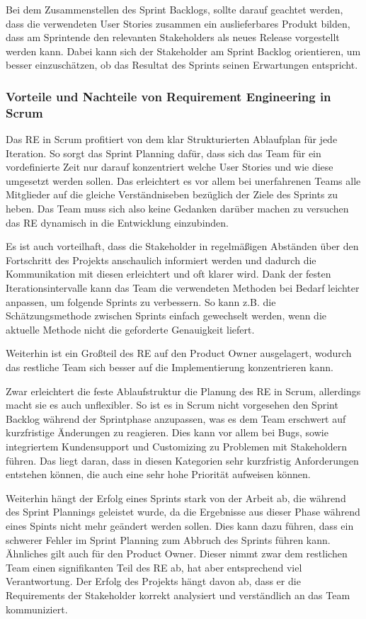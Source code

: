 \documentclass[acmtog]{acmart}
\begin{document}
Bei dem Zusammenstellen des Sprint Backlogs, sollte darauf geachtet werden, dass die verwendeten User Stories zusammen ein auslieferbares 
Produkt bilden, dass am Sprintende den relevanten Stakeholders als neues Release vorgestellt werden kann. Dabei kann sich der Stakeholder 
am Sprint Backlog orientieren, um besser einzuschätzen, ob das Resultat des Sprints seinen Erwartungen entspricht. \cite{reinscrum}

\subsubsection{Vorteile und Nachteile von Requirement Engineering in Scrum}

Das RE in Scrum profitiert von dem klar Strukturierten Ablaufplan für jede Iteration. So sorgt das Sprint Planning dafür, dass sich das 
Team für ein vordefinierte Zeit nur darauf konzentriert welche User Stories  und wie diese umgesetzt werden sollen. Das erleichtert es vor 
allem bei unerfahrenen Teams alle Mitglieder auf die gleiche Verständniseben bezüglich der Ziele des Sprints zu heben. Das Team muss sich 
also keine Gedanken darüber machen zu versuchen das RE dynamisch in die Entwicklung einzubinden.

Es ist auch vorteilhaft, dass die Stakeholder in regelmäßigen Abständen über den Fortschritt des Projekts anschaulich informiert werden und 
dadurch die Kommunikation mit diesen erleichtert und oft klarer wird. Dank der festen Iterationsintervalle kann das Team die verwendeten 
Methoden bei Bedarf leichter anpassen, um folgende Sprints zu verbessern. So kann z.B. die Schätzungsmethode zwischen Sprints einfach gewechselt 
werden, wenn die aktuelle Methode nicht die geforderte Genauigkeit liefert.

Weiterhin ist ein Großteil des RE auf den Product Owner ausgelagert, wodurch das restliche Team sich besser auf die Implementierung konzentrieren kann.

Zwar erleichtert die feste Ablaufstruktur die Planung des RE in Scrum, allerdings macht sie es auch unflexibler. So ist es in Scrum nicht 
vorgesehen den Sprint Backlog während der Sprintphase anzupassen, was es dem Team erschwert auf kurzfristige Änderungen zu reagieren. Dies 
kann vor allem bei Bugs, sowie integriertem Kundensupport und Customizing zu Problemen mit Stakeholdern führen. Das liegt daran, dass in 
diesen Kategorien sehr kurzfristig Anforderungen entstehen können, die auch eine sehr hohe Priorität aufweisen können.

Weiterhin hängt der Erfolg eines Sprints stark von der Arbeit ab, die während des Sprint Plannings geleistet wurde, da die Ergebnisse aus 
dieser Phase während eines Spints nicht mehr geändert werden sollen. Dies kann dazu führen, dass ein schwerer Fehler im Sprint Planning zum 
Abbruch des Sprints führen kann. Ähnliches gilt auch für den Product Owner. Dieser nimmt zwar dem restlichen Team einen signifikanten Teil 
des RE ab, hat aber entsprechend viel Verantwortung. Der Erfolg des Projekts hängt davon ab, dass er die Requirements der Stakeholder korrekt 
analysiert und verständlich an das Team kommuniziert.
\end{document}
